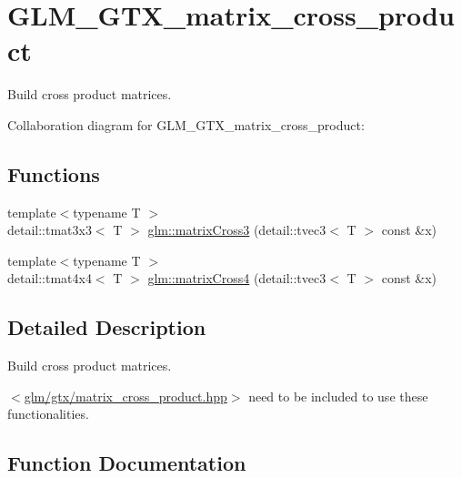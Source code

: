 \hypertarget{group__gtx__matrix__cross__product}{}\section{G\+L\+M\+\_\+\+G\+T\+X\+\_\+matrix\+\_\+cross\+\_\+product}
\label{group__gtx__matrix__cross__product}


Build cross product matrices.  


Collaboration diagram for G\+L\+M\+\_\+\+G\+T\+X\+\_\+matrix\+\_\+cross\+\_\+product\+:
\subsection*{Functions}
\begin{DoxyCompactItemize}
\item 
{\footnotesize template$<$typename T $>$ }\\detail\+::tmat3x3$<$ T $>$ \hyperlink{group__gtx__matrix__cross__product_ga37860965f0a55f52ab2830494ab81934}{glm\+::matrix\+Cross3} (detail\+::tvec3$<$ T $>$ const \&x)
\item 
{\footnotesize template$<$typename T $>$ }\\detail\+::tmat4x4$<$ T $>$ \hyperlink{group__gtx__matrix__cross__product_ga540cb27145ccc1d4f3a9289a41beb910}{glm\+::matrix\+Cross4} (detail\+::tvec3$<$ T $>$ const \&x)
\end{DoxyCompactItemize}


\subsection{Detailed Description}
Build cross product matrices. 

$<$\hyperlink{matrix__cross__product_8hpp}{glm/gtx/matrix\+\_\+cross\+\_\+product.\+hpp}$>$ need to be included to use these functionalities. 

\subsection{Function Documentation}
\hypertarget{group__gtx__matrix__cross__product_ga37860965f0a55f52ab2830494ab81934}{}
